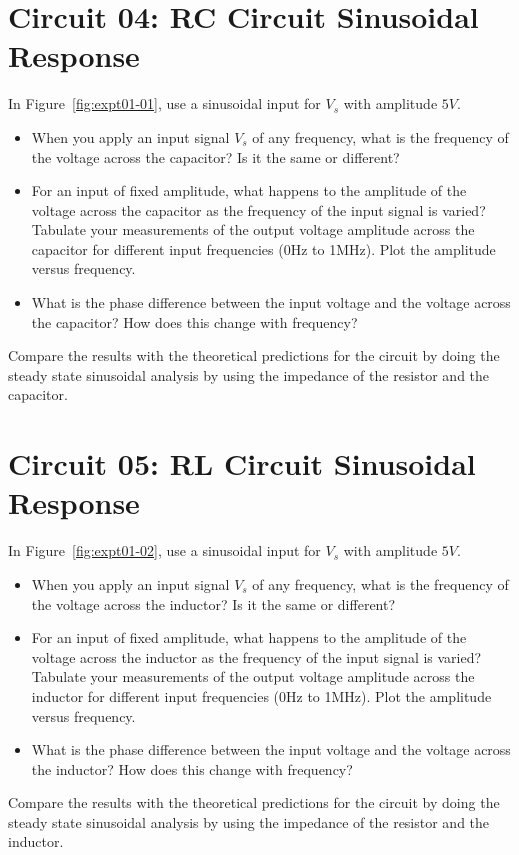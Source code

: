 \section{Circuit 04: RC Circuit Sinusoidal Response}
In Figure~\ref{fig:expt01-01}, use a sinusoidal input for $V_s$ with amplitude $5V$. 
\begin{itemize}
    \item When you apply an input signal $V_s$ of any frequency, what is the frequency of the voltage across the capacitor? Is it the same or different?
    \item For an input of fixed amplitude, what happens to the amplitude of the voltage across the capacitor as the frequency of the input signal is varied? Tabulate your measurements of the output voltage amplitude across the capacitor for different input frequencies (0Hz to 1MHz). Plot the amplitude versus frequency.
    \item What is the phase difference between the input voltage and the voltage across the capacitor? How does this change with frequency?
\end{itemize}
Compare the results with the theoretical predictions for the circuit by doing the steady state sinusoidal analysis by using the impedance of the resistor and the capacitor.

\section{Circuit 05: RL Circuit Sinusoidal Response}
In Figure~\ref{fig:expt01-02}, use a sinusoidal input for $V_s$ with amplitude $5V$. 
\begin{itemize}
    \item When you apply an input signal $V_s$ of any frequency, what is the frequency of the voltage across the inductor? Is it the same or different?
    \item For an input of fixed amplitude, what happens to the amplitude of the voltage across the inductor as the frequency of the input signal is varied? Tabulate your measurements of the output voltage amplitude across the inductor for different input frequencies (0Hz to 1MHz). Plot the amplitude versus frequency.
    \item What is the phase difference between the input voltage and the voltage across the inductor? How does this change with frequency?
\end{itemize}
Compare the results with the theoretical predictions for the circuit by doing the steady state sinusoidal analysis by using the impedance of the resistor and the inductor.

